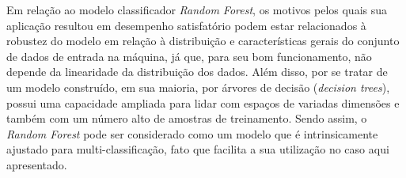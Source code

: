 Em relação ao modelo classificador \textit{Random Forest}, os motivos pelos quais sua aplicação resultou em desempenho satisfatório podem estar relacionados à robustez do modelo em relação à distribuição e características gerais do conjunto de dados de entrada na máquina, já que, para seu bom funcionamento, não depende da linearidade da distribuição dos dados. Além disso, por se tratar de um modelo construído, em sua maioria, por árvores de decisão (\textit{decision trees}), possui uma capacidade ampliada para lidar com espaços de variadas dimensões e também com um número alto de amostras de treinamento. Sendo assim, o \textit{Random Forest} pode ser considerado como um modelo que é intrinsicamente ajustado para multi-classificação, fato que facilita a sua utilização no caso aqui apresentado.


